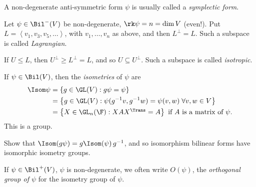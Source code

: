 \vspace{3pt}

\begin{remark}
	A non-degenerate anti-symmetric form  $\psi$ is usually called a \emph{symplectic form}.	

	Let $\psi\in\Bil^-(V)$ be non-degenerate, $\rk\psi=n = \dim V$ (even!). Put $L=\left\langle v_1,v_3,v_5,\ldots \right\rangle$, with $v_1,\ldots,v_n$ as above, and then $L^\perp=L$. Such a subspace is called \emph{Lagrangian}. %
	
	If $U\leq L$, then $U^\perp\geq L^\perp = L$, and so $U\subseteq U^\perp$. Such a subspace is called \emph{isotropic}. %
\end{remark}

	\pagebreak

\begin{definition}
	If $\psi\in\Bil(V)$, then the \emph{isometries} of $\psi$ are %
	\begin{align*}
		\Isom\psi
		&= \left\{g\in\GL(V) : g\psi = \psi\right\} \\
		&= \left\{g\in\GL(V): \psi(g^{-1} v, g^{-1} w) = \psi(v,w)\;\forall v,w\in V\right\} \\ %
		&=\left\{X\in\textstyle\GL_n(\F) : XAX^\Trans = A\right\} \text{ if } A \text{ is a matrix of } \psi. %
	\end{align*}
	This is a group. 
\end{definition}

\begin{exercise}
	Show that $\Isom(g\psi) = g \Isom (\psi) \, g^{-1}$, and so isomorphism bilinear forms have isomorphic isometry groups. %
\end{exercise}

If $\psi\in\Bil^+(V)$, $\psi$ is non-degenerate, we often write $O(\psi)$, the \emph{orthogonal group of $\psi$} for the isometry group of $\psi$.

